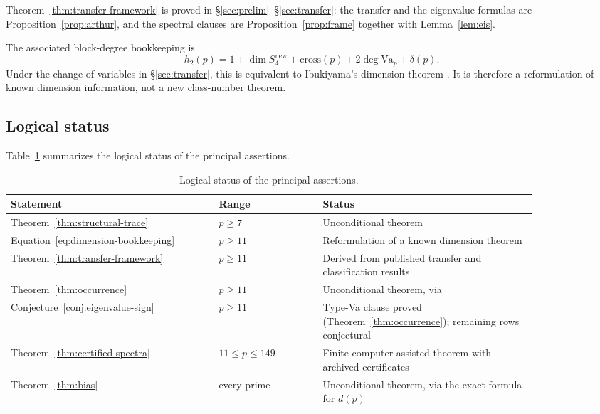 \documentclass[11pt]{amsart}
\theoremstyle{plain}
\theoremstyle{definition}
\newcommand{\Va}{\mathrm{Va}}
\newcommand{\snew}{S^{\mathrm{new}}}
\providecommand{\Va}{\mathrm{Va}}
\providecommand{\snew}{S^{\mathrm{new}}}
\begin{document}
	\noindent Theorem~\ref{thm:transfer-framework} is proved in
	\S\ref{sec:prelim}--\S\ref{sec:transfer}: the transfer and the eigenvalue
	formulas are Proposition~\ref{prop:arthur}, and the spectral clauses are
	Proposition~\ref{prop:frame} together with Lemma~\ref{lem:eis}.
	
	The associated block-degree bookkeeping is
	\begin{equation}\label{eq:dimension-bookkeeping}
		h_2(p)=1+\dim\snew_4+\mathrm{cross}(p)+2\deg\Va_p+\delta(p).
	\end{equation}
	Under the change of variables in \S\ref{sec:transfer}, this is equivalent
	to Ibukiyama's dimension theorem \cite[Thm.~3.1]{Ibukiyama2018conj}. It is
	therefore a reformulation of known dimension information, not a new
	class-number theorem.
	
	\subsection{Logical status}
	Table~\ref{tab:logical-status} summarizes the logical status of the
	principal assertions.
	
	\begin{table}[ht]
		\centering
		\begin{tabular}{@{}p{0.34\linewidth}p{0.17\linewidth}p{0.35\linewidth}@{}}
			\toprule
			Statement & Range & Status \\
			\midrule
			Theorem~\ref{thm:structural-trace} & $p\ge7$ & Unconditional theorem \\
			Equation~\eqref{eq:dimension-bookkeeping} & $p\ge11$ & Reformulation of a known dimension theorem \\
			Theorem~\ref{thm:transfer-framework} & $p\ge11$ & Derived from published transfer and classification results \\
			Theorem~\ref{thm:occurrence} & $p\ge11$ & Unconditional theorem, via \cite[Thm.~11.4]{RoesnerWeissauer2021} \\
			Conjecture~\ref{conj:eigenvalue-sign} & $p\ge11$ & Type-Va clause proved (Theorem~\ref{thm:occurrence}); remaining rows conjectural \\
			Theorem~\ref{thm:certified-spectra} & $11\le p\le149$ & Finite computer-assisted theorem with archived certificates \\
			Theorem~\ref{thm:bias} & every prime & Unconditional theorem, via the exact formula for $d(p)$ \\
			\bottomrule
		\end{tabular}
		\caption{Logical status of the principal assertions.}
		\label{tab:logical-status}
	\end{table}
	
\end{document}
